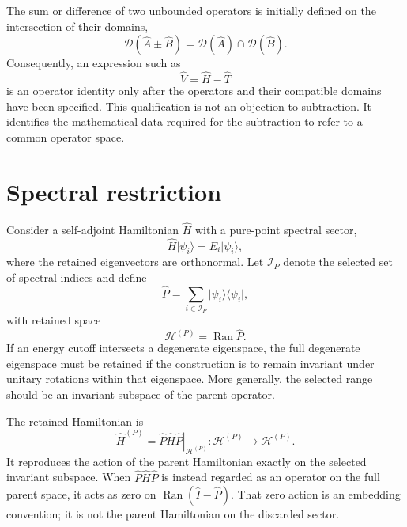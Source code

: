 The sum or difference of two unbounded operators is initially defined on the
intersection of their domains,
\begin{equation}
    \mathcal D(\hat A\pm\hat B)
    =
    \mathcal D(\hat A)\cap\mathcal D(\hat B).
\end{equation}
Consequently, an expression such as
\begin{equation}
    \hat V=\hat H-\hat T
\end{equation}
is an operator identity only after the operators and their compatible domains
have been specified. This qualification is not an objection to subtraction.
It identifies the mathematical data required for the subtraction to refer to
a common operator space.

\section{Spectral restriction}


Consider a self-adjoint Hamiltonian $\hat H$ with a pure-point spectral sector,
\begin{equation}
    \hat H\lvert\psi_i\rangle
    =
    E_i\lvert\psi_i\rangle,
\end{equation}
where the retained eigenvectors are orthonormal. Let $\mathcal I_P$ denote the
selected set of spectral indices and define
\begin{equation}
    \hat P
    =
    \sum_{i\in\mathcal I_P}
    \lvert\psi_i\rangle\langle\psi_i\rvert,
\end{equation}
with retained space
\begin{equation}
    \mathcal H^{(P)}
    =
    \operatorname{Ran}\hat P.
\end{equation}
If an energy cutoff intersects a degenerate eigenspace, the full degenerate
eigenspace must be retained if the construction is to remain invariant under
unitary rotations within that eigenspace. More generally, the selected range
should be an invariant subspace of the parent operator.

The retained Hamiltonian is
\begin{equation}
    \hat H^{(P)}
    =
    \left.
        \hat P\hat H\hat P
    \right|_{\mathcal H^{(P)}}:
    \mathcal H^{(P)}
    \longrightarrow
    \mathcal H^{(P)}.
\end{equation}
It reproduces the action of the parent Hamiltonian exactly on the selected
invariant subspace. When $\hat P\hat H\hat P$ is instead regarded as an
operator on the full parent space, it acts as zero on
$\operatorname{Ran}(\hat I-\hat P)$. That zero action is an embedding
convention; it is not the parent Hamiltonian on the discarded sector.

